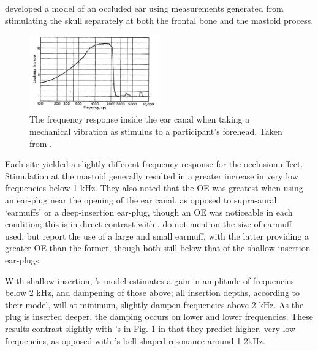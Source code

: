 \cite{stenfelt:07} developed a model of an occluded ear using measurements generated from stimulating the skull separately at both the frontal bone and the mastoid process.
%
\begin{figure}
\includegraphics[width=0.5\textwidth]{figure/bekesy60-1.png}
\caption{The frequency response inside the ear canal when taking a mechanical vibration as stimulus to a participant's forehead.  Taken from \cite{bekesy:60}.}
\label{fig:bekesyOEresponse}
\end{figure}
%
Each site yielded a slightly different frequency response for the occlusion effect.  Stimulation at the mastoid generally resulted in a greater increase in very low frequencies below 1 kHz.  They also noted that the OE was greatest when using an ear-plug near the opening of the ear canal, as opposed to supra-aural `earmuffs' or a deep-insertion ear-plug, though an OE was noticeable in each condition; this is in direct contrast with \cite{dean:00}.  \cite{dean:00} do not mention the size of earmuff used, but \cite{stenfelt:07} report the use of a large and small earmuff, with the latter providing a greater OE than the former, though both still below that of the shallow-insertion ear-plugs.

With shallow insertion, \cite{stenfelt:07}'s model estimates a gain in amplitude of frequencies below 2 kHz, and dampening of those above; all insertion depths, according to their model, will at minimum, slightly dampen frequencies above 2 kHz.  As the plug is inserted deeper, the damping occurs on lower and lower frequencies. These results contrast slightly with \cite{bekesy:60}'s in Fig. \ref{fig:bekesyOEresponse} in that they predict higher, very low frequencies, as opposed with \cite{bekesy:60}'s bell-shaped resonance around 1-2kHz.


